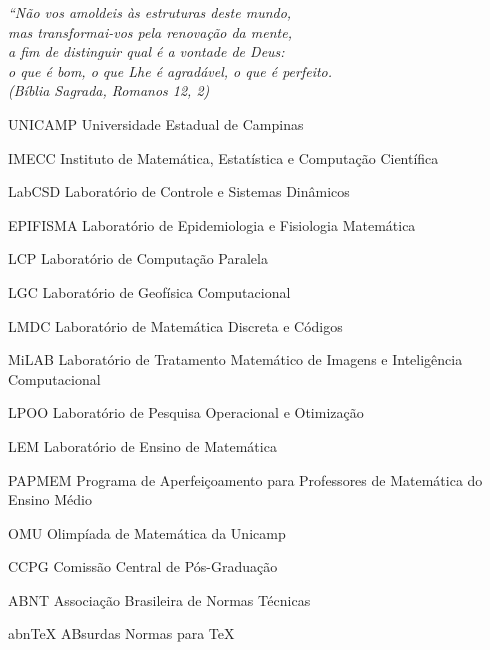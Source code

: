 \documentclass[
	oldfontcommands,
	sumario=tradicional,
	12pt,			%
	openright,		%
	oneside,		%
	a4paper,		%
	english,		%
	english			%
	]{imecc-unicamp}
\begin{document}
\begin{epigrafe}
    \vspace*{\fill}
    \begin{flushright}
	\textit{``Não vos amoldeis às estruturas deste mundo, \\
	    mas transformai-vos pela renovação da mente, \\
	    a fim de distinguir qual é a vontade de Deus: \\
	    o que é bom, o que Lhe é agradável, o que é perfeito.\\
	    (Bíblia Sagrada, Romanos 12, 2)
	}
    \end{flushright}
\end{epigrafe}

\listoffigures*
\cleardoublepage
\listoftables*
\cleardoublepage
\begin{siglas}
  \item[UNICAMP] Universidade Estadual de Campinas
  \item[IMECC] Instituto de Matemática, Estatística e Computação Científica
  \item[LabCSD] Laboratório de Controle e Sistemas Dinâmicos
  \item[EPIFISMA] Laboratório de Epidemiologia e Fisiologia Matemática
  \item[LCP] Laboratório de Computação Paralela
  \item[LGC] Laboratório de Geofísica Computacional
  \item[LMDC] Laboratório de Matemática Discreta e Códigos
  \item[MiLAB] Laboratório de Tratamento Matemático de Imagens e Inteligência Computacional
  \item[LPOO] Laboratório de Pesquisa Operacional e Otimização
  \item[LEM] Laboratório de Ensino de Matemática
  \item[PAPMEM] Programa de Aperfeiçoamento para Professores de Matemática do Ensino Médio
  \item[OMU] Olimpíada de Matemática da Unicamp
  \item[CCPG] Comissão Central de Pós-Graduação
  \item[ABNT] Associação Brasileira de Normas Técnicas
  \item[abnTeX] ABsurdas Normas para TeX
\end{siglas}
\end{document}
